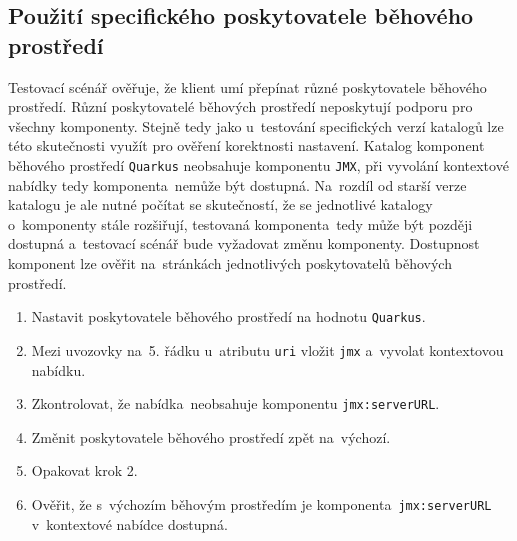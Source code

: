 \subsection{Použití specifického poskytovatele běhového prostředí}
Testovací scénář ověřuje, že klient umí přepínat různé poskytovatele běhového prostředí. Různí poskytovatelé běhových prostředí neposkytují podporu pro všechny komponenty. Stejně tedy jako u~testování specifických verzí katalogů lze této skutečnosti využít pro ověření korektnosti nastavení. Katalog komponent běhového prostředí \texttt{Quarkus} neobsahuje komponentu \texttt{JMX}, při vyvolání kontextové nabídky tedy komponenta~nemůže být dostupná. Na~rozdíl od starší verze katalogu je ale nutné počítat se skutečností, že se jednotlivé katalogy o~komponenty stále rozšiřují, testovaná komponenta~tedy může být později dostupná a~testovací scénář bude vyžadovat změnu komponenty. Dostupnost komponent lze ověřit na~stránkách jednotlivých poskytovatelů běhových prostředí.

\begin{enumerate}
    \item Nastavit poskytovatele běhového prostředí na hodnotu \texttt{Quarkus}.
    \item Mezi uvozovky na~5. řádku u~atributu \texttt{uri} vložit \texttt{jmx} a~vyvolat kontextovou nabídku.
    \item Zkontrolovat, že nabídka~neobsahuje komponentu \texttt{jmx:serverURL}.
    \item Změnit poskytovatele běhového prostředí zpět na~výchozí. 
    \item Opakovat krok 2.
    \item Ověřit, že s~výchozím běhovým prostředím je komponenta~\texttt{jmx:serverURL} v~kontextové nabídce dostupná.
\end{enumerate}

